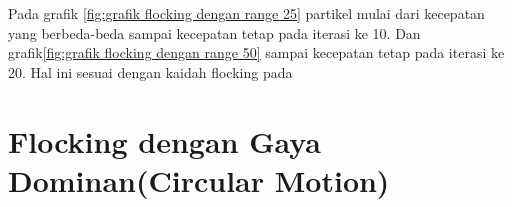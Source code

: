 \hspace{0.6cm} Pada grafik \ref{fig:grafik flocking dengan range 25} partikel mulai dari kecepatan yang berbeda-beda sampai kecepatan tetap pada iterasi ke 10. Dan grafik\ref{fig:grafik flocking dengan range 50} sampai kecepatan tetap pada iterasi ke 20. Hal ini sesuai dengan kaidah flocking pada \citep{Bajec2007} 

\section{Flocking dengan Gaya Dominan(Circular Motion)}%

